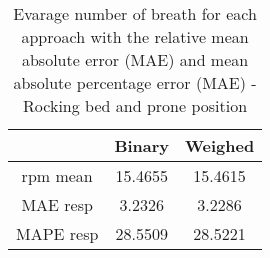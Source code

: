\begin{table}[h]
    \centering
    \begin{tabular}{|c|c|c|}
    \hline 
    & Binary & Weighed \\ 
    
    \hline 
    rpm mean & 15.4655  & 15.4615  \\
MAE resp   &   3.2326   &  3.2286 \\ 
MAPE resp   & 28.5509   & 28.5221 \\ 
    \hline 
\end{tabular}
\caption{Evarage number of breath for each approach with the relative mean
absolute error (MAE) and mean absolute percentage error (MAE) - Rocking bed
and prone position}
\label{tab:ProneRockingMetrics}
\end{table}